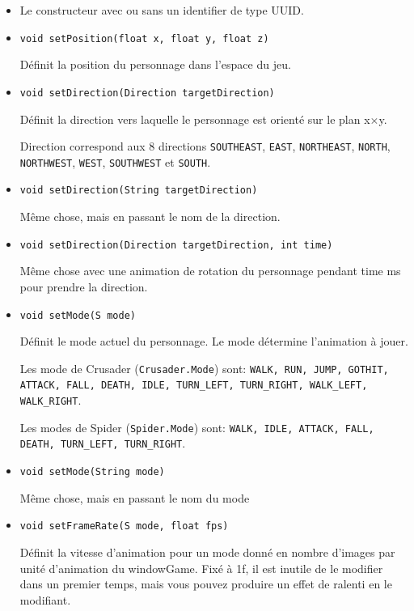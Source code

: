 \documentclass{article}
\newcommand{\code}[1]{\lstinline{#1}}
\begin{document}
\begin{itemize}

    \item Le constructeur avec ou sans un identifier de type UUID.

    \item \code{void setPosition(float x, float y, float z)}

    Définit la position du personnage dans l'espace du jeu.

    \item \code{void setDirection(Direction targetDirection)}

    Définit la direction vers laquelle le personnage est orienté sur le plan x$\times$y.

    Direction correspond aux 8 directions \code{SOUTHEAST}, \code{EAST}, \code{NORTHEAST}, 
    \code{NORTH}, \code{NORTHWEST}, \code{WEST}, \code{SOUTHWEST} et \code{SOUTH}.

    \item \code{void setDirection(String targetDirection)}

    Même chose, mais en passant le nom de la direction.

    \item \code{void setDirection(Direction targetDirection, int time)}

    Même chose avec une animation de rotation du personnage pendant time ms pour prendre la direction.

    \item \code{void setMode(S mode)}

    Définit le mode actuel du personnage.
    Le mode détermine l'animation à jouer.

    Les mode de Crusader (\code{Crusader.Mode}) sont:
    \code{WALK, RUN, JUMP, GOTHIT, ATTACK, FALL, DEATH, IDLE, TURN_LEFT, TURN_RIGHT, WALK_LEFT, WALK_RIGHT}.

    Les modes de Spider (\code{Spider.Mode}) sont:
    \code{WALK, IDLE, ATTACK, FALL, DEATH, TURN_LEFT, TURN_RIGHT}.

    \item \code{void setMode(String mode)}

    Même chose, mais en passant le nom du mode

    \item \code{void setFrameRate(S mode, float fps)}

        Définit la vitesse d'animation pour un mode donné en nombre d'images par unité d'animation du windowGame. 
        Fixé à 1f, il est inutile de le modifier dans un premier temps, mais vous pouvez produire un effet de ralenti en le modifiant.


\end{itemize}
\end{document}
